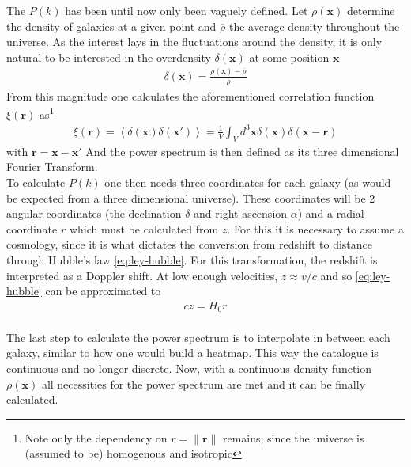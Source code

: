 The $P(k)$ has been until now only been vaguely defined. Let  $\rho(\textbf{x})$ determine the density of galaxies at a given point and $ \overline{\rho}$ the average density throughout the universe. As the interest lays in the fluctuations around the density, it is only natural to be interested in the overdensity $\delta(\textbf{x})$ at some position $\textbf{x}$
\begin{align}
	\delta(\textbf{x}) = \frac{\rho\left( \textbf{x} \right) - \overline{\rho}}{\overline{\rho}}
	\label{eq:overdensity)}
\end{align}
From this magnitude one calculates the aforementioned correlation function $\xi(\textbf{r})$ as\footnote{Note only the dependency on $r = \|\textbf{r}\|$ remains, since the universe is (assumed to be) homogenous and isotropic}
\begin{align}
	\xi(\textbf{r}) = \left<\delta(\textbf{x}) \delta(\textbf{x}') \right> = \frac{1}{V}\int_{V}^{}  d^3 \textbf{x} \delta(\textbf{x}) \delta\left(\textbf{x} - \textbf{r}  \right) 
\end{align} with $\textbf{r} = \textbf{x} - \textbf{x}'$
And the power spectrum is then defined as its three dimensional Fourier Transform.\\

To calculate $P(k)$ one then needs three coordinates for each galaxy (as would be expected from a three dimensional universe). These coordinates will be 2 angular coordinates (the declination $\delta$ and right ascension $\alpha$) and a radial coordinate $r$ which must be calculated from $z$. For this it is necessary to assume a cosmology, since it is what dictates the conversion from redshift to distance through Hubble's law \eqref{eq:ley-hubble}. For this transformation, the redshift is interpreted as a Doppler shift. At low enough velocities, $z\approx v /c$ and so \eqref{eq:ley-hubble} can be approximated to 
\begin{align}
c z = H_0 r	
\end{align}\\

The last step to calculate the power spectrum is to interpolate in between each galaxy, similar to how one would build a heatmap. This way the catalogue is continuous and no longer discrete. Now, with a continuous density function $\rho(\textbf{x})$ all necessities for the power spectrum are met and it can be finally calculated.\\

